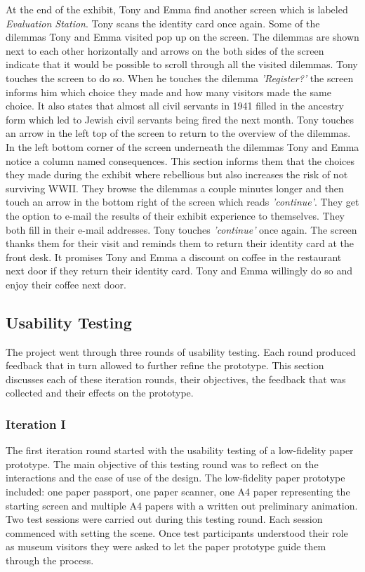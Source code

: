 At the end of the exhibit, Tony and Emma find another screen which is labeled \textit{Evaluation Station}. Tony scans the identity card once again. Some of the dilemmas Tony and Emma visited pop up on the screen. The dilemmas are shown next to each other horizontally and arrows on the both sides of the screen indicate that it would be possible to scroll through all the visited dilemmas. Tony touches the screen to do so. When he touches the dilemma \textit{'Register?'} the screen informs him which choice they made and how many visitors made the same choice. It also states that almost all civil servants in 1941 filled in the ancestry form which led to Jewish civil servants being fired the next month. Tony touches an arrow in the left top of the screen to return to the overview of the dilemmas. In the left bottom corner of the screen underneath the dilemmas Tony and Emma notice a column named consequences. This section informs them that the choices they made during the exhibit where rebellious but also increases the risk of not surviving WWII. They browse the dilemmas a couple minutes longer and then touch an arrow in the bottom right of the screen which reads \textit{'continue'}. They get the option to e-mail the results of their exhibit experience to themselves. They both fill in their e-mail addresses. Tony touches \textit{'continue'} once again. The screen thanks them for their visit and reminds them to return their identity card at the front desk. It promises Tony and Emma a discount on coffee in the restaurant next door if they return their identity card. Tony and Emma willingly do so and enjoy their coffee next door.

\newpage
 \label{sys_req}


\subsection{Usability Testing} \label{US_TEST}
The project went through three rounds of usability testing. Each round produced feedback that in turn allowed to further refine the prototype. This section discusses each of these iteration rounds, their objectives, the feedback that was collected and their effects on the prototype.

\subsubsection{Iteration I}
The first iteration round started with the usability testing of a low-fidelity paper prototype. The main objective of this testing round was to reflect on the interactions and the ease of use of the design. The low-fidelity paper prototype included: one paper passport, one paper scanner, one A4 paper representing the starting screen and multiple A4 papers with a written out preliminary animation. Two test sessions were carried out during this testing round. Each session commenced with setting the scene. Once test participants understood their role as museum visitors they were asked to let the paper prototype guide them through the process.

